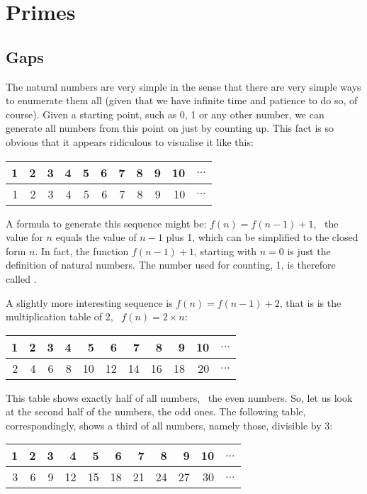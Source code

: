 \documentclass{scrreprt}
\begin{document}
\setlength{\parindent}{0pt}
\setlength{\parskip}{8pt}

\tableofcontents

\chapter{Primes} %
\section{Gaps}

The natural numbers are very simple in the sense
that there are very simple ways to enumerate them all
(given that we have infinite time and patience to do so, of course).
Given a starting point, such as 0, 1 or any other number,
we can generate all numbers from this point on
just by counting up.
This fact is so obvious that it appears ridiculous
to visualise it like this:

\begin{tabular}{r|r|r|r|r|r|r|r|r|r|c}
1 & 2 & 3 & 4 & 5 & 6 & 7 & 8 & 9 & 10 & $\dots$ \\\hline
1 & 2 & 3 & 4 & 5 & 6 & 7 & 8 & 9 & 10 & $\dots$  
\end{tabular}

A formula to generate this sequence might be:
$f(n) = f(n - 1) + 1$, \ie\ the value for $n$ equals
the value of $n-1$ plus 1, which can be simplified
to the closed form $n$.
In fact, the function $f(n-1) + 1$,
starting with $n=0$ is just the definition
of natural numbers.
The number used for counting, 1, is therefore called .

A slightly more interesting sequence is $f(n) = f(n-1) + 2$,
that is is the multiplication table of 2, \ie\ $f(n) = 2 \times n$:

\begin{tabular}{r|r|r|r|r|r|r|r|r|r|c}
1 & 2 & 3 & 4 & 5  & 6  & 7  & 8  & 9  & 10 & $\dots$ \\\hline
2 & 4 & 6 & 8 & 10 & 12 & 14 & 16 & 18 & 20 & $\dots$
\end{tabular}

This table shows exactly half of all numbers, \viz\
the even numbers.
So, let us look at the second half of the numbers,
the odd ones.
The following table, correspondingly, shows a third of all numbers,
namely those, divisible by 3:

\begin{tabular}{r|r|r|r|r|r|r|r|r|r|c}
1 & 2 & 3 & 4  & 5  & 6  & 7  & 8  & 9  & 10 & $\dots$ \\\hline
3 & 6 & 9 & 12 & 15 & 18 & 21 & 24 & 27 & 30 & $\dots$
\end{tabular}
\end{document}
